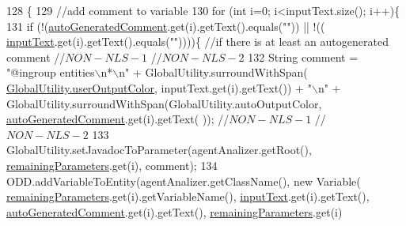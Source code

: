\begin{DoxyCode}
128                                     \{ 
129         \textcolor{comment}{//add comment to variable}
130         \textcolor{keywordflow}{for} (\textcolor{keywordtype}{int} i=0; i<inputText.size(); i++)\{
131             \textcolor{keywordflow}{if} (!(\hyperlink{classit_1_1isislab_1_1masonhelperdocumentation_1_1mason_1_1wizards_1_1_f___agent_variables_page_a40035836d72bb86df98d0bb6035afb91}{autoGeneratedComment}.get(i).getText().equals(\textcolor{stringliteral}{""})) || !((
      \hyperlink{classit_1_1isislab_1_1masonhelperdocumentation_1_1mason_1_1wizards_1_1_f___agent_variables_page_a56e56862c30449ec5c07b8ac33d3b19f}{inputText}.get(i).getText().equals(\textcolor{stringliteral}{""}))))\{  \textcolor{comment}{//if there is at least an autogenerated comment
       //$NON-NLS-1$ //$NON-NLS-2$}
132                 String comment = \textcolor{stringliteral}{"@ingroup entities\(\backslash\)n*\(\backslash\)n"} + GlobalUtility.surroundWithSpan(
      \hyperlink{classit_1_1isislab_1_1masonhelperdocumentation_1_1analizer_1_1_global_utility_aec864cd710b27ece609c5a6093211ff4}{GlobalUtility.userOutputColor}, inputText.get(i).getText()) + \textcolor{stringliteral}{"\(\backslash\)n"} + 
      GlobalUtility.surroundWithSpan(GlobalUtility.autoOutputColor, \hyperlink{classit_1_1isislab_1_1masonhelperdocumentation_1_1mason_1_1wizards_1_1_f___agent_variables_page_a40035836d72bb86df98d0bb6035afb91}{autoGeneratedComment}.get(i).getText(
      )); \textcolor{comment}{//$NON-NLS-1$ //$NON-NLS-2$}
133                 GlobalUtility.setJavadocToParameter(agentAnalizer.getRoot(), 
      \hyperlink{classit_1_1isislab_1_1masonhelperdocumentation_1_1mason_1_1wizards_1_1_f___agent_variables_page_ade36fab1c0254d3ac94c077a06fb75f2}{remainingParameters}.get(i), comment);
134                 ODD.addVariableToEntity(agentAnalizer.getClassName(), \textcolor{keyword}{new} Variable(
      \hyperlink{classit_1_1isislab_1_1masonhelperdocumentation_1_1mason_1_1wizards_1_1_f___agent_variables_page_ade36fab1c0254d3ac94c077a06fb75f2}{remainingParameters}.get(i).getVariableName(), \hyperlink{classit_1_1isislab_1_1masonhelperdocumentation_1_1mason_1_1wizards_1_1_f___agent_variables_page_a56e56862c30449ec5c07b8ac33d3b19f}{inputText}.get(i).getText(), 
      \hyperlink{classit_1_1isislab_1_1masonhelperdocumentation_1_1mason_1_1wizards_1_1_f___agent_variables_page_a40035836d72bb86df98d0bb6035afb91}{autoGeneratedComment}.get(i).getText(), \hyperlink{classit_1_1isislab_1_1masonhelperdocumentation_1_1mason_1_1wizards_1_1_f___agent_variables_page_ade36fab1c0254d3ac94c077a06fb75f2}{remainingParameters}.get(i)

\end{DoxyCode}
